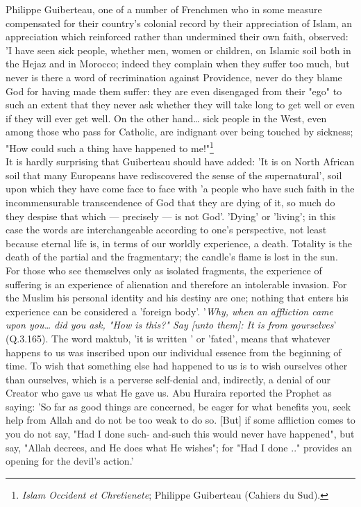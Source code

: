 \documentclass[11pt, b5paper, twoside]{book}
\begin{document}
Philippe Guiberteau, one of a number of Frenchmen who in some measure compensated for their country's 
colonial record by their appreciation of Islam, an appreciation which reinforced rather than 
undermined their own faith, observed: 'I have seen sick people, whether men, women or children, on 
Islamic soil both in the Hejaz and in Morocco; indeed they complain when they suffer too much, but 
never is there a word of recrimination against Providence, never do they blame God for having made 
them suffer: they are even disengaged from their "ego" to such an extent that they never ask whether 
they will take long to get well or even if they will ever get well. On the other hand\ldots{} sick people 
in the West, even among those who pass for Catholic, are indignant over being touched by sickness; 
"How could such a thing have happened to me!"\footnote{\emph{Islam Occident et Chretienete}; Philippe Guiberteau (Cahiers du Sud).}\\ 

It is hardly surprising that Guiberteau should have added: 'It is on North African soil that many 
Europeans have rediscovered the sense of the supernatural', soil upon which they have come face to 
face with 'a people who have such faith in the incommensurable transcendence of God that they are 
dying of it, so much do they despise that which --- precisely --- is not God'. 'Dying' or 'living'; in 
this case the words are interchangeable according to one's perspective, not least because eternal 
life is, in terms of our worldly experience, a death. Totality is the death of the partial and the 
fragmentary; the candle's flame is lost in the sun. \\

For those who see themselves only as isolated fragments, the experience of suffering is an experience 
of alienation and therefore an intolerable invasion. For the Muslim his personal identity and his 
destiny are one; nothing that enters his experience can be considered a 'foreign body'. '\emph{Why, when an 
affliction came upon you\ldots{} did you ask, "How is this?" Say [unto them]: It is from 
yourselves}' (Q.3.165). The word maktub, 'it is written ' or 'fated', means that whatever happens to us 
was inscribed upon our individual essence from the beginning of time. To wish that something else had 
happened to us is to wish ourselves other than ourselves, which is a perverse self-denial and, 
indirectly, a denial of our Creator who gave us what He gave us. Abu Huraira reported the Prophet as 
saying: 'So far as good things are concerned, be eager for what benefits you, seek help from Allah 
and do not be too weak to do so. [But] if some affliction comes to you do not say, "Had I done such-
and-such this would never have happened", but say, "Allah decrees, and He does what He wishes"; for 
"Had I done .." provides an opening for the devil's action.' \\
\end{document}
